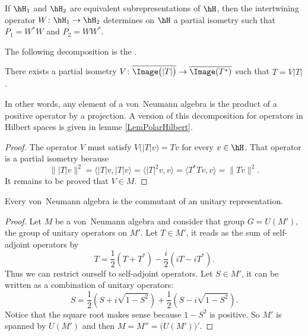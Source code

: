 \begin{proposition}
If $\hH_1$ and $\hH_2$ are equivalent subrepresentations of $\hH$, then the intertwining operator $W\colon \hH_1\to \hH_2$ determines on $\hH$ a partial isometry such that $P_1=W^*W$ and $P_2=WW^*$.
\end{proposition}

The following decomposition is the .
\begin{proposition}		\label{PropPolarvNA}
There exists a partial isometry $V\colon \overline{ \Image\big(| T |\big) }\to \overline{ \Image(T^*) }$ such that $T=V| T |$.
\end{proposition}

In other words, any element of a von~Neumann algebra is the product of a positive operator by a projection. A version of this decomposition for operators in Hilbert spaces is given in lemme \ref{LemPolarHilbert}.

\begin{proof}
The operator $V$ must satisfy $V\big( | T |v \big)=Tv$ for every $v\in\hH$. That operator is a partial isometry because
\[ 
  \big\| | T |v \big\|^2=\langle | T |v, | T |v\rangle =\langle | T |^2v, v\rangle =\langle T^*Tv, v\rangle =\| Tv \|^2.
\]
It remains to be proved that $V\in M$.
\end{proof}



\begin{lemma}		\label{LemVNCommunit}
Every von~Neumann algebra is the commutant of an unitary representation.
\end{lemma}

\begin{proof}
Let $M$ be a von~Neumann algebra and consider that group $G=U(M')$, the group of unitary operators on $M'$. Let $T\in M'$, it reads as the sum of self-adjoint operators by
\[ 
  T=\frac{ 1 }{2}(T+T^*)-\frac{ i }{2}(iT-iT^*).
\]
Thus we can restrict ourself to self-adjoint operators. Let $S\in M'$, it can be written as a combination of unitary operators:
\[ 
  S=\frac{ 1 }{2}\left( S+i\sqrt{1-S^2} \right)+\frac{ 1 }{2}\left( S-i\sqrt{1-S^2} \right).
\]
Notice that the square root makes sense because $1-S^2$ is positive. So $M'$ is spanned by $U(M')$ and then $M=M''=\big( U(M') \big)'$.
\end{proof}

